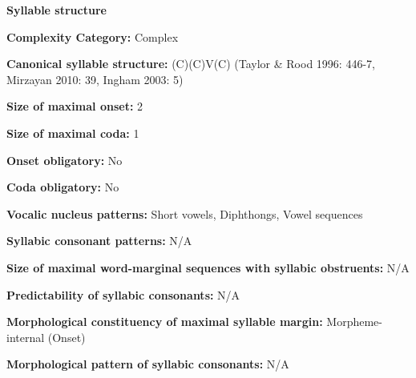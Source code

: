 \begin{styleBody}
\textbf{Syllable structure}
\end{styleBody}

\begin{styleBody}
\textbf{Complexity Category:} Complex
\end{styleBody}

\begin{styleBody}
\textbf{Canonical syllable structure:} (C)(C)V(C) (Taylor \& Rood 1996: 446-7, Mirzayan 2010: 39, Ingham 2003: 5)
\end{styleBody}

\begin{styleBody}
\textbf{Size of maximal onset:} 2
\end{styleBody}

\begin{styleBody}
\textbf{Size of maximal coda:} 1
\end{styleBody}

\begin{styleBody}
\textbf{Onset obligatory:} No
\end{styleBody}

\begin{styleBody}
\textbf{Coda obligatory:} No
\end{styleBody}

\begin{styleBody}
\textbf{Vocalic nucleus patterns:} Short vowels, Diphthongs, Vowel sequences
\end{styleBody}

\begin{styleBody}
\textbf{Syllabic consonant patterns:} N/A
\end{styleBody}

\begin{styleBody}
\textbf{Size of maximal word{}-marginal sequences with syllabic obstruents:} N/A
\end{styleBody}

\begin{styleBody}
\textbf{Predictability of syllabic consonants:} N/A
\end{styleBody}

\begin{styleBody}
\textbf{Morphological constituency of maximal syllable margin:} Morpheme-internal (Onset)
\end{styleBody}

\begin{styleBody}
\textbf{Morphological pattern of syllabic consonants:} N/A
\end{styleBody}

